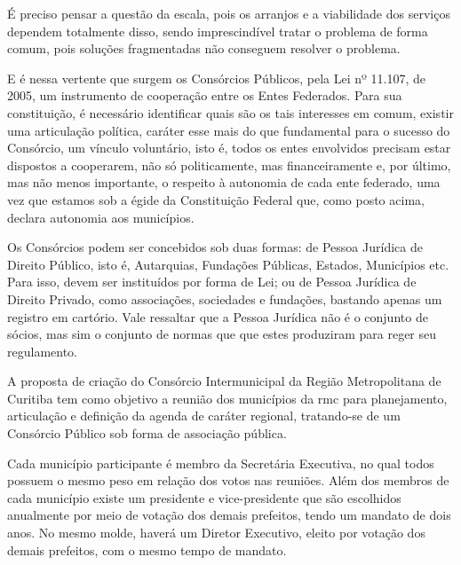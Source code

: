 	É preciso pensar a questão da escala, pois os arranjos e a viabilidade dos serviços dependem totalmente disso, sendo imprescindível tratar o problema de forma comum, pois soluções fragmentadas não conseguem resolver o problema.
	
	E é nessa vertente que surgem os Consórcios Públicos, pela Lei nº 11.107, de 2005, um instrumento de cooperação entre os Entes Federados. Para sua constituição, é necessário identificar quais são os tais interesses em comum, existir uma articulação política, caráter esse mais do que fundamental para o sucesso do Consórcio, um vínculo voluntário, isto é, todos os entes envolvidos precisam estar dispostos a cooperarem, não só politicamente, mas financeiramente e, por último, mas não menos importante, o respeito à autonomia de cada ente federado, uma vez que estamos sob a égide da Constituição Federal que, como posto acima, declara autonomia aos municípios.
	
	Os Consórcios podem ser concebidos sob duas formas: de Pessoa Jurídica de Direito Público, isto é, Autarquias, Fundações Públicas, Estados, Municípios etc. Para isso, devem ser instituídos por forma de Lei; ou de Pessoa Jurídica de Direito Privado, como associações, sociedades e fundações, bastando apenas um registro em cartório. Vale ressaltar que a Pessoa Jurídica não é o conjunto de sócios, mas sim o conjunto de normas que que estes produziram para reger seu regulamento.
	
	A proposta de criação do Consórcio Intermunicipal da Região Metropolitana de Curitiba tem como objetivo a reunião dos municípios da \gls{rmc} para planejamento, articulação e definição da agenda de caráter regional, tratando-se de um Consórcio Público sob forma de associação pública.
	
	Cada município participante é membro da Secretária Executiva, no qual todos possuem o mesmo peso em relação dos votos nas reuniões. Além dos membros de cada município existe um presidente e vice-presidente que são escolhidos anualmente por meio de votação dos demais prefeitos, tendo um mandato de dois anos. No mesmo molde, haverá um Diretor Executivo, eleito por votação dos demais prefeitos, com o mesmo tempo de mandato.
	
	
	\postextual
	
